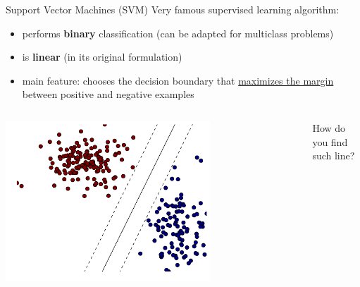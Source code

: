 \begin{frame}{Support Vector Machines (SVM)}
Very famous supervised learning algorithm:
\begin{itemize}
\item performs \textbf{binary} classification (can be adapted for multiclass problems)
\item is \textbf{linear} (in its original formulation) 
\item main feature: chooses the decision boundary that \underline{maximizes the margin} between positive and negative examples
\end{itemize}
\begin{columns}
\begin{column}{0.5\textwidth}
\begin{center}
\includegraphics[width=0.7\textwidth]{img/svm/max_margin.pdf}
\end{center}
\end{column}
\begin{column}{0.5\textwidth}
How do you find such line?
\end{column}
\end{columns}
\end{frame}